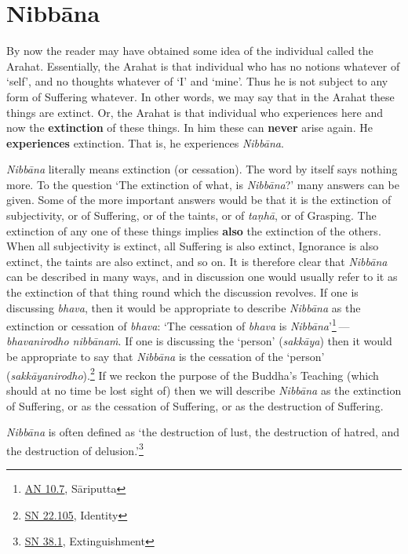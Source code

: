 \chapter{Nibbāna}

By now the reader may have obtained some idea of the individual called the Arahat. Essentially, the Arahat is that individual who has no notions whatever of `self', and no thoughts whatever of `I' and `mine'. Thus he is not subject to any form of Suffering whatever. In other words, we may say that in the Arahat these things are extinct. Or, the Arahat is that individual who experiences here and now the \textbf{extinction} of these things. In him these can \textbf{never} arise again. He \textbf{experiences} extinction. That is, he experiences \emph{Nibbāna}.

\emph{Nibbāna} literally means extinction (or cessation). The word by itself says nothing more. To the question `The extinction of what, is \emph{Nibbāna}?' many answers can be given. Some of the more important answers would be that it is the extinction of subjectivity, or of Suffering, or of the taints, or of \emph{taṇhā}, or of Grasping. The extinction of any one of these things implies \textbf{also} the extinction of the others. When all subjectivity is extinct, all Suffering is also extinct, Ignorance is also extinct, the taints are also extinct, and so on. It is therefore clear that \emph{Nibbāna} can be described in many ways, and in discussion one would usually refer to it as the extinction of that thing round which the discussion revolves. If one is discussing \emph{bhava}, then it would be appropriate to describe \emph{Nibbāna} as the extinction or cessation of \emph{bhava}: `The cessation of \emph{bhava} is \emph{Nibbāna}'\footnote{\href{https://suttacentral.net/an10.7/en/bodhi}{AN 10.7}, Sāriputta} --- \emph{bhavanirodho nibbānaṁ}. If one is discussing the `person' (\emph{sakkāya}) then it would be appropriate to say that \emph{Nibbāna} is the cessation of the `person' (\emph{sakkāyanirodho}).\footnote{\href{https://suttacentral.net/sn22.105/en/sujato}{SN 22.105}, Identity} If we reckon the purpose of the Buddha's Teaching (which should at no time be lost sight of) then we will describe \emph{Nibbāna} as the extinction of Suffering, or as the cessation of Suffering, or as the destruction of Suffering.

\emph{Nibbāna} is often defined as `the destruction of lust, the destruction of hatred, and the destruction of delusion.'\footnote{\href{https://suttacentral.net/sn38.1/en/sujato}{SN 38.1}, Extinguishment}

